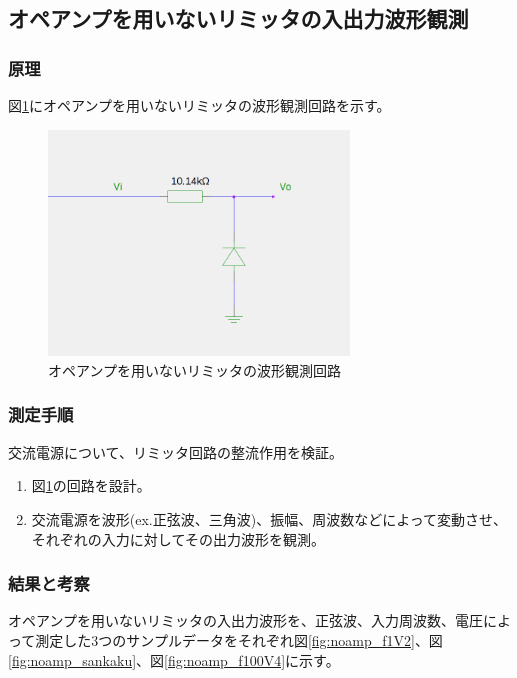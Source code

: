 \documentclass[11pt,a4j]{jsarticle}
\begin{document}
  \subsection{オペアンプを用いないリミッタの入出力波形観測}
   \subsubsection{原理}
    
    図\ref{fig:noamp_wave}にオペアンプを用いないリミッタの波形観測回路を示す。
    
    \begin{figure}[htbp]
  \centering
  \includegraphics[width=8cm,clip]{noamp_wave.png}
  \caption{オペアンプを用いないリミッタの波形観測回路}
  \label{fig:noamp_wave}
 \end{figure}%
    
   \subsubsection{測定手順}
    交流電源について、リミッタ回路の整流作用を検証。
    \begin{enumerate}
    \item 図\ref{fig:noamp_wave}の回路を設計。
    \item 交流電源を波形(ex.正弦波、三角波)、振幅、周波数などによって変動させ、それぞれの入力に対してその出力波形を観測。
    \end{enumerate}
    
   \subsubsection{結果と考察}
    
    オペアンプを用いないリミッタの入出力波形を、正弦波、入力周波数、電圧によって測定した3つのサンプルデータをそれぞれ図\ref{fig:noamp_f1V2}、図\ref{fig:noamp_sankaku}、図\ref{fig:noamp_f100V4}に示す。
    
\end{document}
